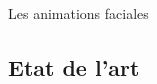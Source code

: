 \documentclass[compress,pdf,11pt,xcolor=dvipsnames]{beamer}
\begin{document}
\begin{frame}{Les animations faciales}
      
  \end{frame}

\subsection{Etat de l'art}
\end{document}
